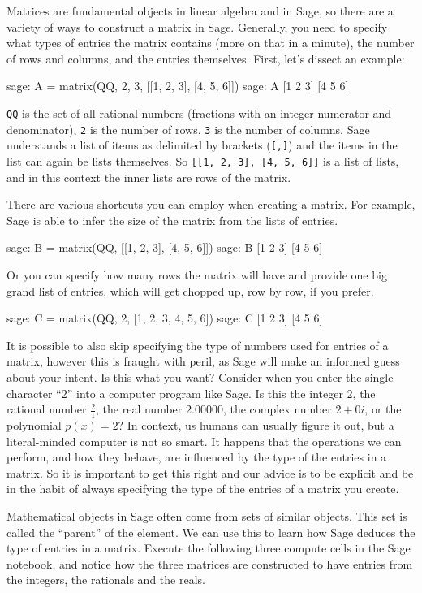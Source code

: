 %
Matrices are fundamental objects in linear algebra and in Sage, so there are a variety of ways to construct a matrix in Sage.  Generally, you need to specify what types of entries the matrix contains (more on that in a minute), the number of rows and columns, and the entries themselves.  First, let's dissect an example:
\par
%
\begin{sageexample}
sage: A = matrix(QQ, 2, 3, [[1, 2, 3], [4, 5, 6]])
sage: A
[1 2 3]
[4 5 6]
\end{sageexample}
%
\verb?QQ? is the set of all rational numbers (fractions with an integer numerator and denominator), \verb?2? is the number of rows, \verb?3? is the number of columns.  Sage understands a list of items as delimited by brackets (\verb?[,]?) and the items in the list can again be lists themselves.  So \verb?[[1, 2, 3], [4, 5, 6]]? is a list of lists, and in this context the inner lists are rows of the matrix.\par
%
There are various shortcuts you can employ when creating a matrix.  For example, Sage is able to infer the size of the matrix from the lists of entries.
%
\begin{sageexample}
sage: B = matrix(QQ, [[1, 2, 3], [4, 5, 6]])
sage: B
[1 2 3]
[4 5 6]
\end{sageexample}
%
Or you can specify how many rows the matrix will have and provide one big grand list of entries, which will get chopped up, row by row, if you prefer.
%
\begin{sageexample}
sage: C = matrix(QQ, 2, [1, 2, 3, 4, 5, 6])
sage: C
[1 2 3]
[4 5 6]
\end{sageexample}
%
It is possible to also skip specifying the type of numbers used for entries of a matrix, however this is fraught with peril, as Sage will make an informed guess about your intent.  Is this what you want?  Consider when you enter the single character ``2'' into a computer program like Sage.  Is this the integer $2$, the rational number $\frac{2}{1}$, the real number $2.00000$, the complex number $2 + 0i$, or the polynomial $p(x)=2$?  In context, us humans can usually figure it out, but a literal-minded computer is not so smart.  It happens that the operations we can perform, and how they behave, are influenced by the type of the entries in a matrix.  So it is important to get this right and our advice is to be explicit and be in the habit of always specifying the type of the entries of a matrix you create.\par
%
Mathematical objects in Sage often come from sets of similar objects.  This set is called the ``parent'' of the element.  We can use this to learn how Sage deduces the type of entries in a matrix.  Execute the following three compute cells in the Sage notebook, and notice how the three matrices are constructed to have entries from the integers, the rationals and the reals.
